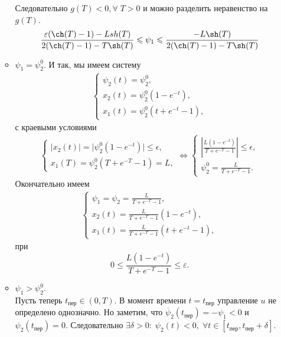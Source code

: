 \documentclass[11pt]{article}
\begin{document}
\begin{enumerate}
\begin{itemize}
   			Следовательно $ g(T) < 0, \forall \; T > 0 $ и можно разделить неравенство на $ g(T). $
   			\begin{gather*}
   				\frac{\varepsilon(\ch(T) - 1) - L sh(T)}{2(\ch(T) - 1) - T \sh(T)} \leqslant \psi_1 \leqslant \frac{-L \sh(T)}{2(\ch(T) - 1) - T \sh(T)}  			
   			\end{gather*}
   			\item $ \psi_1 = \psi_2^0. $ И так, мы имеем систему
   			\begin{gather*}
   				\begin{cases}
   					\psi_2(t) = \psi_2^ 0, \\
   					x_2(t) = \psi_2^0(1 - e^{-t}), \\
   					x_1(t) = \psi_2^0(t + e^{-t} - 1),
   				\end{cases}  			
   			\end{gather*}
   			с краевыми условиями
   			\begin{gather*}
   				\begin{cases}
   					\vert x_2(t) \vert = \vert \psi_2^0(1 - e^{-t}) \vert \leqslant \epsilon, \\
   					x_1(T) = \psi_2^0(T + e^{-T} - 1) = L,
   				\end{cases}
   				\Leftrightarrow
   				\begin{cases}
   					\left \vert \frac{L(1 - e^{-t})}{T + e^{-T} - 1} \right \vert \leqslant \epsilon, \\
   					\psi_2^0 = \frac{L}{T + e^{-T} - 1}.
   				\end{cases}
   			\end{gather*}
   			Окончательно имеем
   			\begin{gather*}
   				\begin{cases}
   					\psi_1 = \psi_2 = \frac{L}{T + e^{-T} - 1}, \\
   					x_2(t) = \frac{L}{T + e^{-T} - 1}(1 - e^{-t}), \\
   					x_1(t) = \frac{L}{T + e^{-T} - 1}(t + e^{-t} - 1),
   				\end{cases}  			
   			\end{gather*}
   			при 
   			$$
   				0 \leqslant \frac{L(1 - e^{-t})}{T + e^{-T} - 1} \leqslant \varepsilon.
   			$$
   			\item $ \psi_1 > \psi_2^0. $ \\
   			Пусть теперь $ t_{пер} \in (0, T). $  %
   			В момент времени $ t = t_{\text{пер}} $ управление $ u $ не определено однозначно. Но заметим, что $ \dot{\psi_2}(t_{\text{пер}}) = -\psi_1 < 0 $ и $ \psi_2(t_{\text{пер}}) = 0. $ Следовательно $ \exists \delta > 0 : \; \psi_2(t) < 0, \; \forall t \in [t_{\text{пер}}, t_{\text{пер}} + \delta]. $ \\

\end{itemize}
\end{enumerate}
\end{document}
